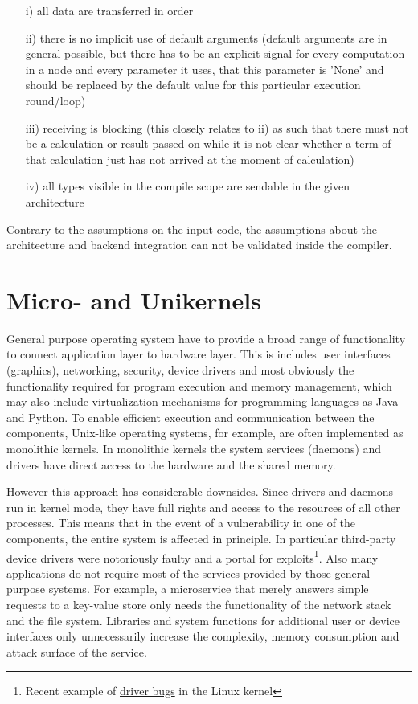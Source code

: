 \begin{itemize}
    \item[i)] all data are transferred in order
    \item[ii)] there is no implicit use of default arguments (default arguments are in general possible, but there has to be an explicit signal for every computation in a node and every parameter it uses, that this parameter is 'None' and should be replaced by the default value for this particular execution round/loop)
    \item[iii)] receiving is blocking (this closely relates to ii) as such that there must not be a calculation or result passed on while it is not clear whether a term of that calculation just has not arrived at the moment of calculation) 
    \item[iv)] all types visible in the compile scope are sendable in the given architecture
\end{itemize}

Contrary to the assumptions on the input code, the assumptions about the architecture and backend integration can not be validated inside the compiler. 

    
\section{Micro- and Unikernels}

General purpose operating system have to provide a broad range of functionality to connect application layer to hardware layer. This is includes user interfaces (graphics), networking, security, device drivers and most obviously the functionality required for program execution and memory management, which may also include virtualization mechanisms for programming languages as Java and Python. To enable efficient execution and communication between the components, Unix-like operating systems, for example, are often implemented as monolithic kernels. In monolithic kernels the system services (daemons) and drivers have direct access to the hardware and the shared memory. 

However this approach has considerable downsides. Since drivers and daemons run in kernel mode, they have full rights and access to the resources of all other processes. This means that in the event of a vulnerability in one of the components, the entire system is affected in principle. In particular third-party device drivers were notoriously faulty and a portal for exploits\footnote{Recent example of \href{https://nakedsecurity.sophos.com/2021/03/17/serious-security-the-linux-kernel-bugs-that-surfaced-after-15-years/}{driver bugs} in the Linux kernel }. Also many applications do not require most of the services provided by those general purpose systems. For example, a microservice that merely answers simple requests to a key-value store only needs the functionality of the network stack and the file system. Libraries and system functions for additional user or device interfaces only unnecessarily increase the complexity, memory consumption and attack surface of the service. \\

